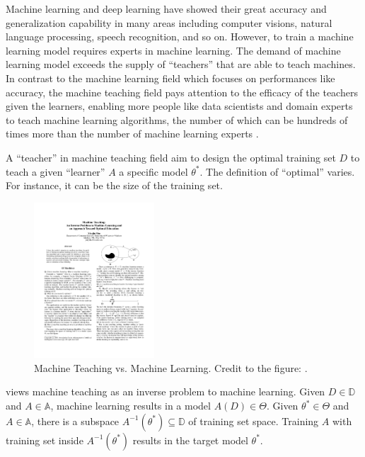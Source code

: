     Machine learning and deep learning have showed their great accuracy and generalization capability
    in many areas including computer visions, natural language processing, speech recognition, and so on.
    However, to train a machine learning model requires experts in machine learning.
    The demand of machine learning model exceeds the supply of ``teachers'' that are able to teach machines.
    In contrast to the machine learning field which focuses on performances like accuracy,
    the machine teaching field pays attention to the efficacy of the teachers given the learners,
    enabling more people like data scientists and domain experts to teach machine learning algorithms,
    the number of which can be hundreds of times more than the number of machine learning experts \cite{Simard2017}.

    A ``teacher'' in machine teaching field aim to design the optimal training set $D$
    to teach a given ``learner'' $A$ a specific model $\theta^*$.
    The definition of ``optimal'' varies.
    For instance, it can be the size of the training set.

    \begin{figure}[!htp]
        \centering
        \includegraphics[width=0.4\textwidth]{img/machine-teaching-vs-machine-learning.pdf}
        \caption{Machine Teaching vs. Machine Learning. Credit to the figure: \textcite{Zhu2015}.}
        \label{fig:machine-teaching-vs-machine-learning}
    \end{figure}

    \cite{Zhu2018} views machine teaching as an inverse problem to machine learning.
    Given $D \in \mathbb{D}$ and $A \in \mathbb{A}$, machine learning results in a model $A(D) \in \Theta$.
    Given $\theta^* \in \Theta$ and $A \in \mathbb{A}$,
    there is a subspace $A^{-1}(\theta^*) \subseteq \mathbb{D}$ of training set space. 
    Training $A$ with training set inside $A^{-1}(\theta^*)$ results in the target model $\theta^*$.

